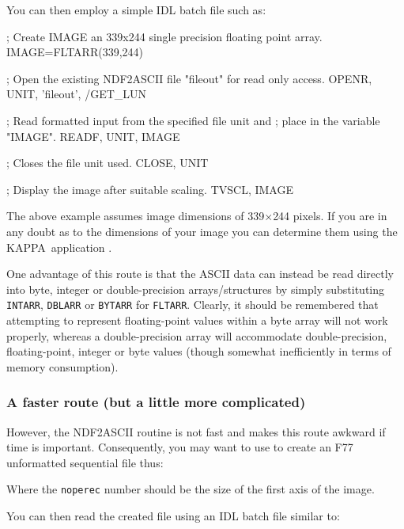 \documentclass[twoside,11pt]{starlink}
\providecommand{\KAPPA}{{\footnotesize KAPPA}}
\begin{document}
You can then employ a simple IDL batch file such as:
\begin{terminalv}
; Create IMAGE an 339x244 single precision floating point array.
IMAGE=FLTARR(339,244)

; Open the existing NDF2ASCII file "fileout" for read only access.
OPENR, UNIT, 'fileout', /GET_LUN

; Read formatted input from the specified file unit and
; place in the variable "IMAGE".
READF, UNIT, IMAGE

; Closes the file unit used.
CLOSE, UNIT

; Display the image after suitable scaling.
TVSCL, IMAGE
\end{terminalv}
The above example assumes image dimensions of 339$\times$244 pixels.
If you are in any doubt as to the dimensions of your image you can
determine them using the \KAPPA\ application
.

One advantage of this route is that the ASCII data can instead be read
directly into byte, integer or double-precision arrays/structures by
simply substituting \texttt{INTARR}, \texttt{DBLARR} or \texttt{BYTARR} for
\texttt{FLTARR}. Clearly, it should be remembered that attempting to represent
floating-point values
within a byte array will not work properly, whereas a double-precision
array will accommodate double-precision, floating-point, integer or byte
values (though somewhat inefficiently in terms of memory consumption).


\subsubsection{A faster route (but a little more complicated)}
However, the NDF2ASCII routine is not fast and makes this route awkward
if time is important. Consequently, you may want to use
 to create an F77 unformatted sequential file thus:

\begin{terminalv}
\end{terminalv}
Where the \texttt{noperec} number should be the size of the first axis of
the image.

You can then read the created file using an IDL batch file similar to:
\end{document}
